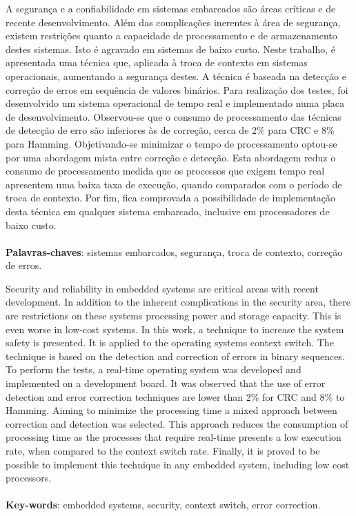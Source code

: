 \documentclass[12pt,openright,oneside,a4paper,brazil]{abntex2}
\begin{document}
\begin{resumo}
A segurança e a confiabilidade em sistemas embarcados são áreas críticas e de recente desenvolvimento. Além das complicações inerentes à área de segurança, existem restrições quanto a capacidade de processamento e de armazenamento destes sistemas. Isto é agravado em sistemas de baixo custo. Neste trabalho, é apresentada uma técnica que, aplicada à troca de contexto em sistemas operacionais, aumentando a segurança destes. A técnica é baseada na detecção e correção de erros em sequência de valores binários. Para realização dos testes, foi desenvolvido um sistema operacional de tempo real e implementado numa placa de desenvolvimento. Observou-se que o consumo de processamento das técnicas de detecção de erro são inferiores às de correção, cerca de 2\% para CRC e 8\% para Hamming. Objetivando-se minimizar o tempo de processamento optou-se por uma abordagem mista entre correção e detecção. Esta abordagem reduz o consumo de processamento medida que os processos que exigem tempo real apresentem uma baixa taxa de execução, quando comparados com o período de troca de contexto. Por fim, fica comprovada a possibilidade de implementação desta técnica em qualquer sistema embarcado, inclusive em processadores de baixo custo.\\
\\
	\noindent
	\textbf{Palavras-chaves}: sistemas embarcados, segurança, troca de contexto, correção de erros.
\end{resumo}



\begin{resumo}[Abstract]
Security and reliability in embedded systems are critical areas with recent development. In addition to the inherent complications in the security area, there are restrictions on these systems processing power and storage capacity. This is even worse in low-cost systems. In this work, a technique to increase the system safety is presented. It is applied to the operating systems context switch. The technique is based on the detection and correction of errors in binary sequences. To perform the tests, a real-time operating system was developed and implemented on a development board. It was observed that the use of error detection and error correction techniques are lower than 2\% for CRC and 8\% to Hamming. Aiming to minimize the processing time a mixed approach between correction and detection was selected. This approach reduces the consumption of processing time as the processes that require real-time presents a low execution rate, when compared to the context switch rate. Finally, it is proved to be possible to implement this technique in any embedded system, including low cost processors.\\
\\
	\noindent
	\textbf{Key-words}: embedded systems, security, context switch, error correction.
\end{resumo}
\end{document}
